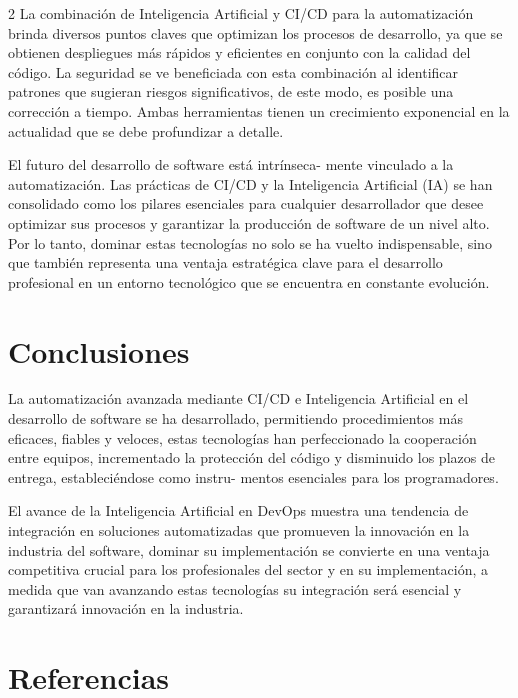 \documentclass[12pt,spanish,Letterpaper,openany]{book}
\begin{document}
\begin {multicols}{2}
La combinación de Inteligencia Artificial y CI/CD para la automatización brinda diversos
puntos claves que optimizan los procesos de desarrollo, ya que se obtienen despliegues más
rápidos y eficientes en conjunto con la calidad del código. La seguridad se ve beneficiada con
esta combinación al identificar patrones que sugieran riesgos significativos, de este modo, es
posible una corrección a tiempo. Ambas herramientas tienen un crecimiento exponencial en
la actualidad que se debe profundizar a detalle.

El futuro del desarrollo de software está intrínseca-
mente vinculado a la automatización. Las
prácticas de CI/CD y la Inteligencia Artificial (IA) se han consolidado como los pilares
esenciales para cualquier desarrollador que desee optimizar sus procesos y garantizar la
producción de software de un nivel alto. Por lo tanto, dominar estas tecnologías no solo se ha
vuelto indispensable, sino que también representa una ventaja estratégica clave para el
desarrollo profesional en un entorno tecnológico que se encuentra en constante evolución.

\hypertarget{conclusiones-11}{%
\section{Conclusiones}\label{conclusiones-11}}

La automatización avanzada mediante CI/CD e Inteligencia Artificial en el desarrollo de
software se ha desarrollado, permitiendo procedimientos más eficaces, fiables y veloces, estas
tecnologías han perfeccionado la cooperación entre equipos, incrementado la protección del
código y disminuido los plazos de entrega, estableciéndose como instru-
mentos esenciales
para los programadores.

El avance de la Inteligencia Artificial en DevOps muestra una tendencia de integración en
soluciones automatizadas que promueven la innovación en la industria del software, dominar
su implementación se convierte en una ventaja competitiva crucial para los profesionales del
sector y en su implementación, a medida que van avanzando estas tecnologías su integración
será esencial y garantizará innovación en la industria.

\hypertarget{referencias-11}{%
\section{Referencias}\label{referencias-11}}


\end{multicols}
\end{document}
